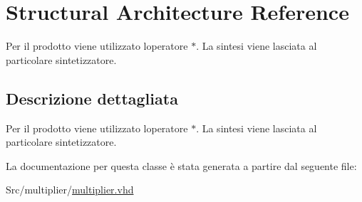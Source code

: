 \hypertarget{classmultiplier_1_1_structural}{}\section{Structural Architecture Reference}
\label{classmultiplier_1_1_structural}


Per il prodotto viene utilizzato l\textquotesingle{}operatore $\ast$. La sintesi viene lasciata al particolare sintetizzatore.  




\subsection{Descrizione dettagliata}
Per il prodotto viene utilizzato l\textquotesingle{}operatore $\ast$. La sintesi viene lasciata al particolare sintetizzatore. 

La documentazione per questa classe è stata generata a partire dal seguente file\+:\begin{DoxyCompactItemize}
\item 
Src/multiplier/\hyperlink{multiplier_8vhd}{multiplier.\+vhd}\end{DoxyCompactItemize}
